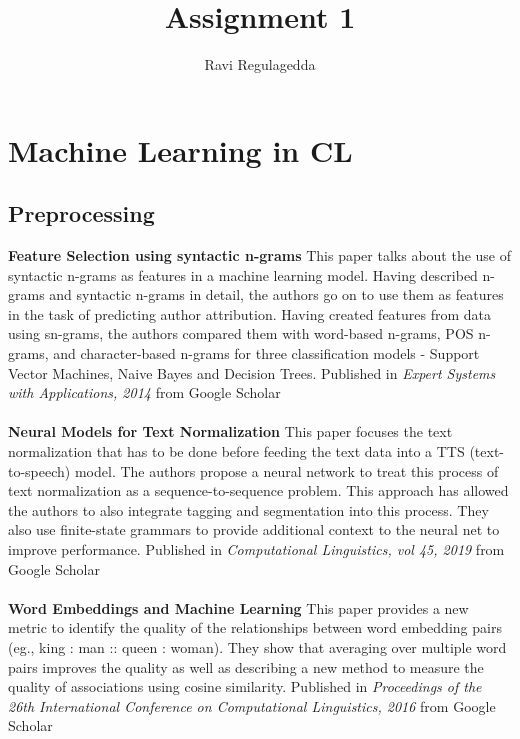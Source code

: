\documentclass[a4]{article}
\title{Assignment 1}
\author{Ravi Regulagedda}
\date{}
\begin{document}
\maketitle
\section*{Machine Learning in CL}
\subsection*{Preprocessing}

\textbf{Feature Selection using syntactic n-grams} \cite{syntacticNGrams} This paper talks about the use of syntactic n-grams as features in a machine learning model. Having described n-grams and syntactic n-grams in detail, the authors go on to use them as features in the task of predicting author attribution. Having created features from data using sn-grams, the authors compared them with word-based n-grams, POS n-grams, and character-based n-grams for three classification models - Support Vector Machines, Naive Bayes and Decision Trees. Published in \textit{Expert Systems with Applications, 2014} from Google Scholar
\\
\\
\textbf{Neural Models for Text Normalization} \cite{neuralText} This paper focuses the text normalization that has to be done before feeding the text data into a TTS (text-to-speech) model. The authors propose a neural network to treat this process of text normalization as a sequence-to-sequence problem. This approach has allowed the authors to also integrate tagging and segmentation into this process. They also use finite-state grammars to provide additional context to the neural net to improve performance. Published in \textit{Computational Linguistics, vol 45, 2019} from Google Scholar
\\
\\
\textbf{Word Embeddings and Machine Learning} \cite{wordEmbed} This paper provides a new metric to identify the quality of the relationships between word embedding pairs (eg., king : man :: queen : woman). They show that averaging over multiple word pairs improves the quality as well as describing a new method to measure the quality of associations using cosine similarity. Published in \textit{Proceedings of the 26th International Conference on Computational Linguistics, 2016} from Google Scholar
\end{document}
